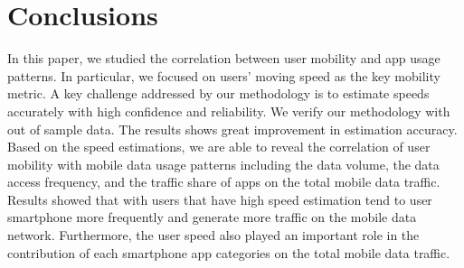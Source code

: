 \section{Conclusions}\label{conclusion}

In this paper, we studied the correlation between user mobility and app usage patterns.
In particular, we focused on users' moving speed as the key mobility metric. 
A key challenge addressed by our methodology is to estimate speeds accurately with high confidence and reliability. 
We verify our methodology with out of sample data. The results shows great improvement in estimation accuracy.
Based on the speed estimations, we are able to reveal the correlation of user mobility with mobile data usage patterns 
including the data volume, the data access frequency, and the traffic share of apps on the total mobile data traffic. 
Results showed that with users that have high speed estimation tend to user smartphone more frequently and 
generate more traffic on the mobile data network. 
Furthermore, the user speed also played an important role in the contribution of each smartphone app categories on the total mobile data traffic. 